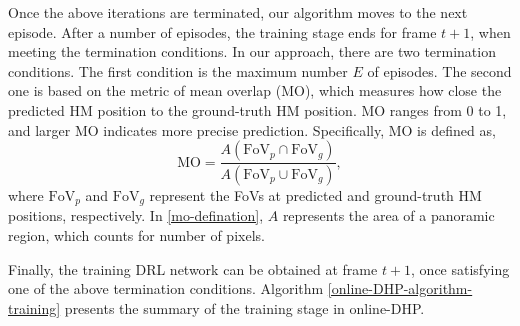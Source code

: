 \documentclass[10pt,journal,compsoc]{IEEEtran}
\begin{document}
%

Once the above iterations are terminated, our algorithm moves to the next episode.
After a number of episodes, the training stage ends for frame $t+1$, when meeting the termination conditions.
In our approach, there are two termination conditions. The first condition is the maximum number $E$ of episodes.
The second one is based on the metric of mean overlap (MO), which measures how close the predicted HM position to the ground-truth HM position.
MO ranges from 0 to 1, and larger MO indicates more precise prediction.
Specifically, MO is defined as,
\begin{equation}
\label{mo-defination}
\textrm{MO} =\frac{A(\textrm{FoV}_{p} \cap \textrm{FoV}_{g})}{A(\textrm{FoV}_{p} \cup \textrm{FoV}_{g})},
\end{equation}
where $\textrm{FoV}_{p}$ and $\textrm{FoV}_{g}$ represent the FoVs at predicted and ground-truth HM positions, respectively.
In \eqref{mo-defination}, $A$ represents the area of a panoramic region, which counts for number of pixels.

Finally, the training DRL network can be obtained at frame $t+1$, once satisfying one of  the above termination conditions.
Algorithm \ref{online-DHP-algorithm-training} presents the summary of the training stage in online-DHP.
\end{document}

